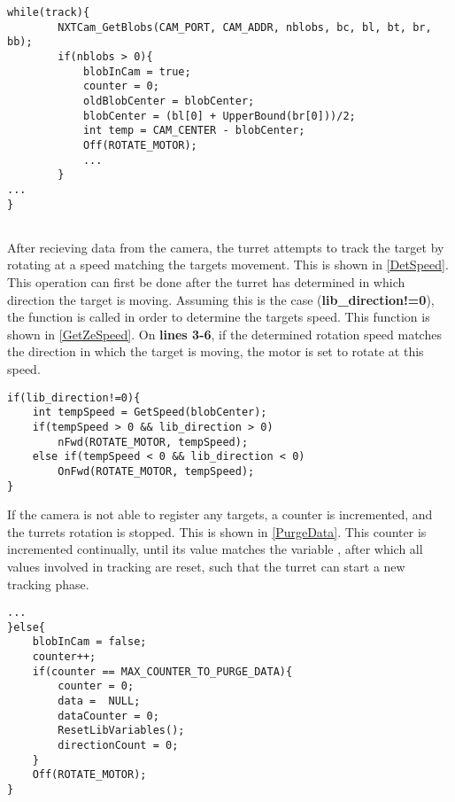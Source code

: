 \begin{minipage}[H]{\linewidth}
\begin{lstlisting}[caption = First part of the general tracking behaviour., label = TrackFirst] 
while(track){        
        NXTCam_GetBlobs(CAM_PORT, CAM_ADDR, nblobs, bc, bl, bt, br, bb);
        if(nblobs > 0){
            blobInCam = true;
            counter = 0;
            oldBlobCenter = blobCenter;
            blobCenter = (bl[0] + UpperBound(br[0]))/2;
            int temp = CAM_CENTER - blobCenter;
            Off(ROTATE_MOTOR);
            ...
        }
...
}        
            
\end{lstlisting}
\end{minipage}

After recieving data from the camera, the turret attempts to track the target by
rotating at a speed matching the targets movement. This is shown in
\autoref{DetSpeed}. This operation can first be done after the turret has
determined in which direction the target is moving. Assuming this is the case
(\textbf{lib\_direction!=0}), the  function is called in order
to determine the targets speed. This function is shown in \autoref{GetZeSpeed}.
On \textbf{lines 3-6}, if the determined rotation speed matches the direction in
which the target is moving, the motor is set to rotate at this speed.\nl

\begin{minipage}[H]{\linewidth}
\begin{lstlisting}[caption = Determine the targets speed at rotate to match it, label = DetSpeed] 
if(lib_direction!=0){
	int tempSpeed = GetSpeed(blobCenter);
	if(tempSpeed > 0 && lib_direction > 0)
		nFwd(ROTATE_MOTOR, tempSpeed);
	else if(tempSpeed < 0 && lib_direction < 0)
		OnFwd(ROTATE_MOTOR, tempSpeed);
}
\end{lstlisting}
\end{minipage}

If the camera is not able to register any targets, a counter is incremented, and
the turrets rotation is stopped. This is shown in \autoref{PurgeData}. This
counter is incremented continually, until its value matches the variable
, after which all values involved
in tracking are reset, such that the turret can start a new tracking phase.\nl

\begin{minipage}[H]{\linewidth}
\begin{lstlisting}[caption = Reset data and turn off motor is no targets are found., label = PurgeData] 
...
}else{
	blobInCam = false;
    counter++;
    if(counter == MAX_COUNTER_TO_PURGE_DATA){
    	counter = 0;
        data =  NULL;
        dataCounter = 0;
        ResetLibVariables();
        directionCount = 0;
    }
    Off(ROTATE_MOTOR);
}
\end{lstlisting}
\end{minipage}

